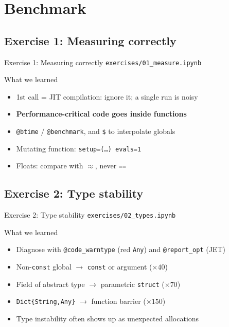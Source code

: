 \section{Benchmark}

\subsection{Exercise 1: Measuring correctly}

\begin{frame}{Exercise 1: Measuring correctly}
    \texttt{exercises/01\_measure.ipynb}

    \pause\bigskip

    \begin{BlockGreen}{What we learned}
        \begin{itemize}
            \item 1st call = JIT compilation: ignore it; a single run is noisy
            \item \textbf{Performance-critical code goes inside functions}
            \item \texttt{@btime} / \texttt{@benchmark}, and \texttt{\$} to interpolate globals
            \item Mutating function: \texttt{setup=(\ldots) evals=1}
            \item Floats: compare with \texttt{\(\approx\)}, never \texttt{==}
        \end{itemize}
    \end{BlockGreen}
\end{frame}

\subsection{Exercise 2: Type stability}

\begin{frame}{Exercise 2: Type stability}
    \texttt{exercises/02\_types.ipynb}

    \pause\bigskip

    \begin{BlockGreen}{What we learned}
        \begin{itemize}
            \item Diagnose with \texttt{@code\_warntype} (red \texttt{Any}) and \texttt{@report\_opt} (JET)
            \item Non-\texttt{const} global \( \to \) \texttt{const} or argument (\( \times 40 \))
            \item Field of abstract type \( \to \) parametric \texttt{struct} (\( \times 70 \))
            \item \texttt{Dict\{String,Any\}} \( \to \) function barrier (\( \times 150 \))
            \item Type instability often shows up as unexpected allocations
        \end{itemize}
    \end{BlockGreen}
\end{frame}

